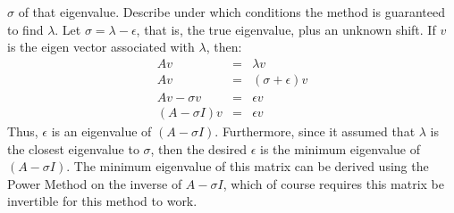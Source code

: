 \documentclass{article}
\newcommand{\ea}[1]{\begin{eqnarray*}#1\end{eqnarray*}}
\begin{document}
$\sigma$ of that eigenvalue.   Describe under which conditions the method is
guaranteed to find $\lambda$.
 Let $\sigma = \lambda-\epsilon$, that is, the true eigenvalue, plus
an unknown shift.  If $v$ is the eigen vector associated with $\lambda$, then:
\ea{ 	Av&=& \lambda v \\
		Av&=& (\sigma+\epsilon) v\\
		Av-\sigma v&=& \epsilon v\\
		(A-\sigma I) v &=& \epsilon v
}
Thus, $\epsilon$ is an eigenvalue of $(A-\sigma I)$.  Furthermore, since it 
assumed that $\lambda$ is the closest eigenvalue to $\sigma$, then the desired 
$\epsilon$ is the minimum eigenvalue of $(A-\sigma I)$.  The minimum eigenvalue of
this matrix can be derived using the Power Method on the inverse of $A-\sigma I$,
which of course requires this matrix be invertible for this method to work.
\end{document}

